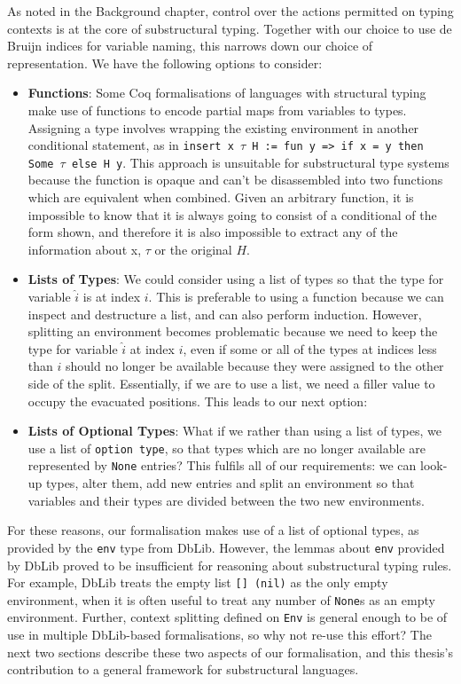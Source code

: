 \documentclass[]{unswthesis}
\let\c\texttt
\begin{document}
As noted in the Background chapter, control over the actions permitted on typing contexts is at the core of substructural typing. Together with our choice to use de Bruijn indices for variable naming, this narrows down our choice of representation. We have the following options to consider:

\begin{itemize}
\item \textbf{Functions}: Some Coq formalisations of languages with structural typing \cite{pierce15} make use of functions to encode partial maps from variables to types. Assigning a type involves wrapping the existing environment in another conditional statement, as in \c{insert x $\tau$ H := fun y => if x = y then Some $\tau$ else H y}. This approach is unsuitable for substructural type systems because the function is opaque and can't be disassembled into two functions which are equivalent when combined. Given an arbitrary function, it is impossible to know that it is always going to consist of a conditional of the form shown, and therefore it is also impossible to extract any of the information about x, $\tau$ or the original $H$.
\item \textbf{Lists of Types}: We could consider using a list of types so that the type for variable $\hat{i}$ is at index $i$. This is preferable to using a function because we can inspect and destructure a list, and can also perform induction. However, splitting an environment becomes problematic because we need to keep the type for variable $\hat{i}$ at index $i$, even if some or all of the types at indices less than $i$ should no longer be available because they were assigned to the other side of the split. Essentially, if we are to use a list, we need a filler value to occupy the evacuated positions. This leads to our next option:
\item \textbf{Lists of Optional Types}: What if we rather than using a list of types, we use a list of \c{option type}, so that types which are no longer available are represented by \c{None} entries? This fulfils all of our requirements: we can look-up types, alter them, add new entries and split an environment so that variables and their types are divided between the two new environments.
\end{itemize}

For these reasons, our formalisation makes use of a list of optional types, as provided by the \c{env} type from DbLib. However, the lemmas about \c{env} provided by DbLib proved to be insufficient for reasoning about substructural typing rules. For example, DbLib treats the empty list \c{[] (nil)} as the only empty environment, when it is often useful to treat any number of \c{None}s as an empty environment. Further, context splitting defined on \c{Env} is general enough to be of use in multiple DbLib-based formalisations, so why not re-use this effort? The next two sections describe these two aspects of our formalisation, and this thesis's contribution to a general framework for substructural languages.
\end{document}
